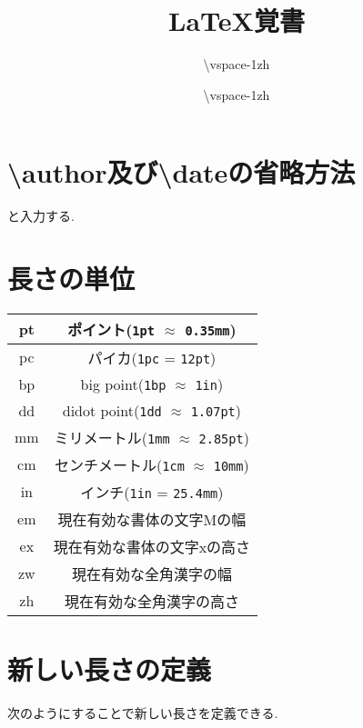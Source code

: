 \documentclass[12pt,uplatex]{jsarticle}
\title{\LaTeX 覚書}
\author{\vspace{-1zh}}\date{\vspace{-1zh}}
\begin{document}
\maketitle
\tableofcontents
\clearpage
\section{\textbackslash author及び\textbackslash dateの省略方法}
\begin{excode}
    \author{\textbackslash vspace{-1zh}}
    \date{\textbackslash vspace{-1zh}}
\end{excode}
と入力する.
\section{長さの単位}
\begin{table}[H]
	\centering
	\begin{tabular}{|c|c|} \hline
		pt & ポイント(\verb|1pt| $\approx$ \verb|0.35mm|) \\ \hline
		pc & パイカ(\verb|1pc| = \verb|12pt|) \\ \hline
		bp & big point(\verb|1bp| $\approx$ \verb|1in|) \\ \hline
		dd & didot point(\verb|1dd| $\approx$ \verb|1.07pt|) \\ \hline
		mm & ミリメートル(\verb|1mm| $\approx$ \verb|2.85pt|) \\ \hline
		cm & センチメートル(\verb|1cm| $\approx$ \verb|10mm|) \\ \hline
		in & インチ(\verb|1in| = \verb|25.4mm|) \\ \hline
		em & 現在有効な書体の文字Mの幅 \\ \hline
		ex & 現在有効な書体の文字xの高さ \\ \hline
		zw & 現在有効な全角漢字の幅 \\ \hline
		zh & 現在有効な全角漢字の高さ \\ \hline
	\end{tabular}
\end{table}

\section{新しい長さの定義}
次のようにすることで新しい長さを定義できる.
\begin{excode}
    \setlength{長さの名前}{初期値}
\end{excode}
\end{document}
